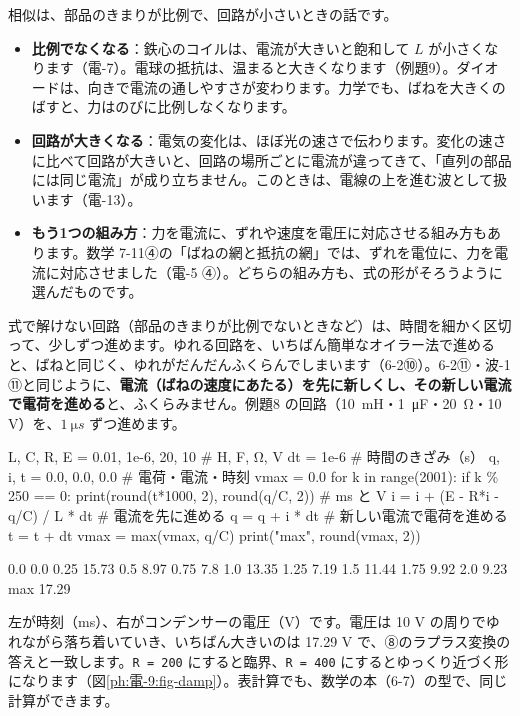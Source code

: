 相似は、部品のきまりが比例で、回路が小さいときの話です。
\begin{itemize}[leftmargin=1.2\zw, itemsep=1pt, topsep=2pt, label={\color{bkTheme}●}]
\item \textbf{比例でなくなる}：鉄心のコイルは、電流が大きいと飽和して $L$ が小さくなります（電-7）。電球の抵抗は、温まると大きくなります（例題9）。ダイオードは、向きで電流の通しやすさが変わります。力学でも、ばねを大きくのばすと、力はのびに比例しなくなります。
\item \textbf{回路が大きくなる}：電気の変化は、ほぼ光の速さで伝わります。変化の速さに比べて回路が大きいと、回路の場所ごとに電流が違ってきて、「直列の部品には同じ電流」が成り立ちません。このときは、電線の上を進む波として扱います（電-13）。
\item \textbf{もう1つの組み方}：力を電流に、ずれや速度を電圧に対応させる組み方もあります。数学 7-11④の「ばねの網と抵抗の網」では、ずれを電位に、力を電流に対応させました（電-5 ④）。どちらの組み方も、式の形がそろうように選んだものです。
\end{itemize}

\label{ph:電-9:sec10}
式で解けない回路（部品のきまりが比例でないときなど）は、時間を細かく区切って、少しずつ進めます。ゆれる回路を、いちばん簡単なオイラー法で進めると、ばねと同じく、ゆれがだんだんふくらんでしまいます（6-2⑩）。6-2⑪・波-1 ⑪と同じように、\textbf{電流（ばねの速度にあたる）を先に新しくし、その新しい電流で電荷を進める}と、ふくらみません。例題8 の回路（\qty{10}{mH}・\qty{1}{\micro F}・\qty{20}{\ohm}・10 V）を、$\qty{1}{\micro s}$ ずつ進めます。
\begin{phcode}[Python]
L, C, R, E = 0.01, 1e-6, 20, 10   \# H, F, Ω, V
dt = 1e-6                         \# 時間のきざみ（s）
q, i, t = 0.0, 0.0, 0.0           \# 電荷・電流・時刻
vmax = 0.0
for k in range(2001):
    if k \% 250 == 0:
        print(round(t*1000, 2), round(q/C, 2))   \# ms と V
    i = i + (E - R*i - q/C) / L * dt   \# 電流を先に進める
    q = q + i * dt                     \# 新しい電流で電荷を進める
    t = t + dt
    vmax = max(vmax, q/C)
print("max", round(vmax, 2))
\end{phcode}
\begin{phcodeout}
0.0 0.0
0.25 15.73
0.5 8.97
0.75 7.8
1.0 13.35
1.25 7.19
1.5 11.44
1.75 9.92
2.0 9.23
max 17.29
\end{phcodeout}
左が時刻（ms）、右がコンデンサーの電圧（V）です。電圧は 10 V の周りでゆれながら落ち着いていき、いちばん大きいのは 17.29 V で、⑧のラプラス変換の答えと一致します。\texttt{R = 200} にすると臨界、\texttt{R = 400} にするとゆっくり近づく形になります（図\ref{ph:電-9:fig-damp}）。表計算でも、数学の本（6-7）の型で、同じ計算ができます。

